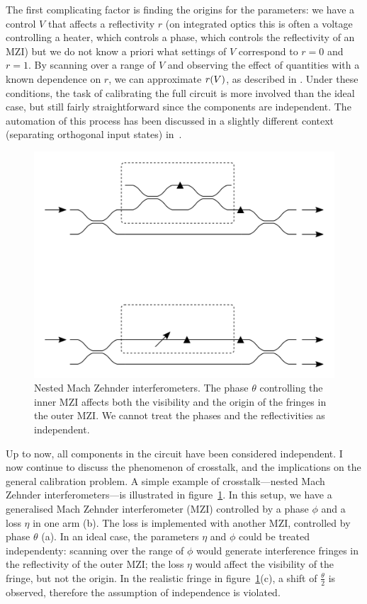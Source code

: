 The first complicating factor is finding the origins for the parameters: we have
a control \(V\) that affects a reflectivity \(r\) (on integrated optics this is
often a voltage controlling a heater, which controls a phase, which controls the
reflectivity of an MZI) but we do not know a priori what settings of \(V\)
correspond to \(r=0\) and \(r=1\). By scanning over a range of \(V\) and
observing the effect of quantities with a known dependence on \(r\), we can
approximate \(r \!\left(V\right)\), as described in \cite{peteschip}. Under these
conditions, the task of calibrating the full circuit is more involved than the
ideal case, but still fairly straightforward since the components are
independent. The automation of this process has been discussed in a slightly
different context (separating orthogonal input states) in~\cite{alignment}.

\begin{figure}[t]
  \centering
  \includegraphics{figures/crosstalk}
  \caption[Nested Mach Zehnder interferometers]
  {Nested Mach Zehnder interferometers. The phase \(\theta\) controlling the
  inner MZI affects both the visibility and the origin of the fringes in the
  outer MZI. We cannot treat the phases and the reflectivities as independent.}
  \label{fig:nestedMZI}
\end{figure}

Up to now, all components in the circuit have been considered independent. I now
continue to discuss the phenomenon of crosstalk, and the implications on the
general calibration problem. A simple example of crosstalk---nested Mach Zehnder
interferometers---is illustrated in figure~\ref{fig:nestedMZI}. In this setup,
we have a generalised Mach Zehnder interferometer (MZI) controlled by a phase
\(\phi\) and a loss \(\eta\) in one arm (b). The loss is implemented with
another MZI, controlled by phase \(\theta\) (a). In an ideal case, the
parameters \(\eta\) and \(\phi\) could be treated independenty: scanning over
the range of \(\phi\) would generate interference fringes in the reflectivity of
the outer MZI; the loss \(\eta\) would affect the visibility of the fringe, but
not the origin. In the realistic fringe in figure~\ref{fig:nestedMZI}(c), a
shift of \(\frac{\theta}{2}\) is observed, therefore the assumption of
independence is violated.

